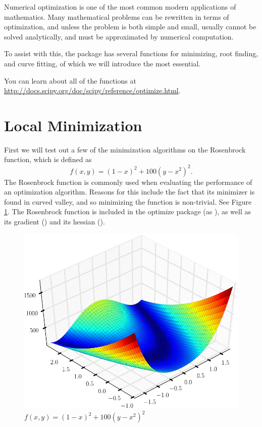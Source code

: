 \label{lab:Optimization1}

Numerical optimization is one of the most common modern applications of mathematics. 
Many mathematical problems can be rewritten in terms of optimization, and unless the problem is both simple and small, usually cannot be solved analytically, and must be approximated by numerical computation. 

To assist with this, the  package has several functions for minimizing, root finding, and curve fitting, of which we will introduce the most essential.

You can learn about all of the functions at \url{http://docs.scipy.org/doc/scipy/reference/optimize.html}.

\section*{Local Minimization}

First we will test out a few of the minimization algorithms on the Rosenbrock function, which is defined as
\[
f(x,y) = (1-x)^2 + 100(y-x^2)^2.
\]
The Rosenbrock function is commonly used when evaluating the performance of an optimization algorithm.
Reasons for this include the fact that its minimizer  is found in  curved valley, and so minimizing the function is non-trivial.
See Figure \ref{opt:rosenbrock}.
The Rosenbrock function is included in the optimize package (as ), as well as its gradient () and its hessian ().

\begin{figure}
\includegraphics[width=\textwidth]{Rosenbrock.pdf}
\caption{$f(x,y) = (1-x)^2 + 100(y-x^2)^2$}
\label{opt:rosenbrock}
\end{figure}

